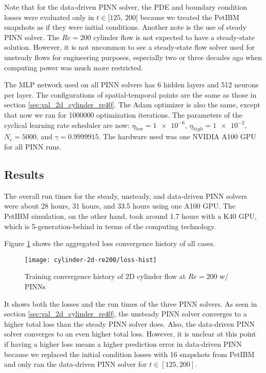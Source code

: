 Note that for the data-driven PINN solver, the PDE and boundary condition losses were evaluated only in $t\in[125$, $200]$ because we treated the PetIBM snapshots as if they were initial conditions.
Another note is the use of steady PINN solver.
The $Re=200$ cylinder flow is not expected to have a steady-state solution.
However, it is not uncommon to see a steady-state flow solver used for unsteady flows for engineering purposes, especially two or three decades ago when computing power was much more restricted.

The MLP network used on all PINN solvers has 6 hidden layers and 512 neurons per layer.
The configurations of spatial-temporal points are the same as those in section \ref{sec:val_2d_cylinder_re40}.
The Adam optimizer is also the same, except that now we ran for \num{1000000} optimization iterations.
The parameters of the cyclical learning rate scheduler are now: $\eta_{low}=\num{1e-6}$, $\eta_{high}=\num{1e-2}$, $N_c=5000$, and $\gamma=\num{0.9999915}$.
The hardware used was one NVIDIA A100 GPU for all PINN runs.

\subsection{Results}\label{sec:cylinder-re200-results}

The overall run times for the steady, unsteady, and data-driven PINN solvers were about 28 hours, 31 hours, and 33.5 hours using one A100 GPU.
The PetIBM simulation, on the other hand, took around 1.7 hours with a K40 GPU, which is 5-generation-behind in terms of the computing technology.

Figure \ref{fig:cylinder-re200-pinn-loss} shows the aggregated loss convergence history of all cases.
\begin{figure}
    \centering%
    \texttt{[image: cylinder-2d-re200/loss-hist]}%
    \caption{%
        Training convergence history of 2D cylinder flow at $Re=\num{200}$ w/ PINNs
    }
    \label{fig:cylinder-re200-pinn-loss}%
\end{figure}
It shows both the losses and the run times of the three PINN solvers.
As seen in section \ref{sec:val_2d_cylinder_re40}, the unsteady PINN solver converges to a higher total loss than the steady PINN solver does.
Also, the data-driven PINN solver converges to an even higher total loss.
However, it is unclear at this point if having a higher loss means a higher prediction error in data-driven PINN because we replaced the initial condition losses with 16 snapshots from PetIBM and only ran the data-driven PINN solver for $t\in[125, 200]$.

